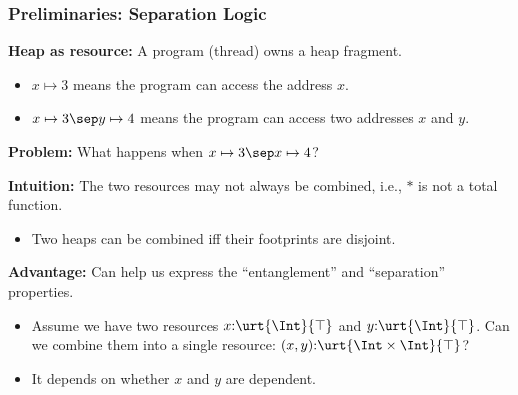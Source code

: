 \begin{frame}[fragile]
    \frametitle{Preliminaries: Separation Logic}

\textbf{Heap as resource:} A program (thread) owns a heap fragment.
    \begin{itemize}
        \item $x \mapsto 3$ means the program can access the address $x$.
        \item $x \mapsto 3 \sep y \mapsto 4$ means the program can access two addresses $x$ and $y$.
    \end{itemize}

\textbf{Problem:} What happens when $x \mapsto 3 \sep x \mapsto 4$?

\textbf{Intuition:} The two resources may not always be combined, i.e., $*$ is not a total function.
\begin{itemize}
    \item Two heaps can be combined iff their footprints are disjoint.
\end{itemize}

\textbf{Advantage:} Can help us express the ``entanglement'' and ``separation'' properties.
\begin{itemize}
    \item Assume we have two resources $x{:}\urt{\Int}{\top}$ and $y{:}\urt{\Int}{\top}$. Can we combine them into a single resource: $(x,y){:}\urt{\Int\times\Int}{\top}$?
    \item It depends on whether $x$ and $y$ are dependent.
\end{itemize}

\end{frame}

